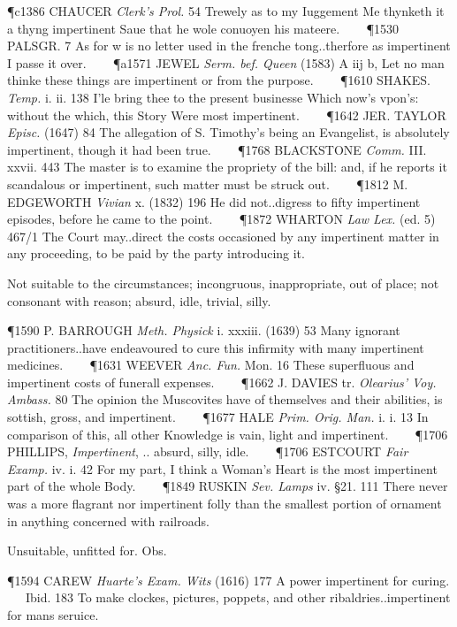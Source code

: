 \begin{description}[wide, labelwidth=!, labelindent=0pt]
\begin{myenumerate}
\P c1386 CHAUCER  \textit{Clerk's Prol.} 54 Trewely as to my Iuggement Me thynketh it a thyng impertinent Saue that he wole conuoyen his mateere.    
\P 1530 PALSGR. 7 As for w is no letter used in the frenche tong..therfore as impertinent I passe it over.    
\P a1571 JEWEL  \textit{Serm. bef. Queen} (1583) A iij b, Let no man thinke these things are impertinent or from the purpose.    
\P 1610 SHAKES.  \textit{Temp.} i. ii. 138 I'le bring thee to the present businesse Which now's vpon's: without the which, this Story Were most impertinent.    
\P 1642 JER. TAYLOR  \textit{Episc.} (1647) 84 The allegation of S. Timothy's being an Evangelist, is absolutely impertinent, though it had been true.    
\P 1768 BLACKSTONE  \textit{Comm.} III. xxvii. 443 The master is to examine the propriety of the bill: and, if he reports it scandalous or impertinent, such matter must be struck out.    
\P 1812 M. EDGEWORTH  \textit{Vivian} x. (1832) 196 He did not..digress to fifty impertinent episodes, before he came to the point.    
\P 1872 WHARTON  \textit{Law Lex.} (ed. 5) 467/1 The Court may..direct the costs occasioned by any impertinent matter in any proceeding, to be paid by the party introducing it.

 Not suitable to the circumstances; incongruous, inappropriate, out of place; not consonant with reason; absurd, idle, trivial, silly.

\P 1590 P. BARROUGH  \textit{Meth. Physick} i. xxxiii. (1639) 53 Many ignorant practitioners..have endeavoured to cure this infirmity with many impertinent medicines.    
\P 1631 WEEVER  \textit{Anc. Fun.} Mon. 16 These superfluous and impertinent costs of funerall expenses.    
\P 1662 J. DAVIES tr.  \textit{Olearius' Voy. Ambass.} 80 The opinion the Muscovites have of themselves and their abilities, is sottish, gross, and impertinent.    
\P 1677 HALE  \textit{Prim. Orig. Man.} i. i. 13 In comparison of this, all other Knowledge is vain, light and impertinent.    
\P 1706 PHILLIPS,  \textit{Impertinent}, .. absurd, silly, idle.    
\P 1706 ESTCOURT  \textit{Fair Examp.} iv. i. 42 For my part, I think a Woman's Heart is the most impertinent part of the whole Body.    
\P 1849 RUSKIN  \textit{Sev. Lamps} iv. §21. 111 There never was a more flagrant nor impertinent folly than the smallest portion of ornament in anything concerned with railroads.

 Unsuitable, unfitted for. Obs.

\P 1594 CAREW  \textit{Huarte's Exam. Wits} (1616) 177 A power impertinent for curing.    Ibid. 183 To make clockes, pictures, poppets, and other ribaldries..impertinent for mans seruice.


\end{myenumerate}
\end{description}
